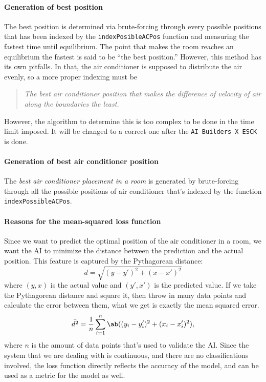 \paragraph{Generation of best position} The best position is determined via brute-forcing through every possible positions that has been indexed by the \texttt{indexPosibleACPos} function and measuring the fastest time until equilibrium. The point that makes the room reaches an equilibrium the fastest is said to be \enquote{the best position.} However, this method has its own pitfalls. In that, the air conditioner is supposed to distribute the air evenly, so a more proper indexing must be
\begin{quote}
    \emph{The best air conditioner position that makes the difference of velocity of air along the boundaries the least.}
\end{quote}
However, the algorithm to determine this is too complex to be done in the time limit imposed. It will be changed to a correct one after the \texttt{AI Builders X ESCK} is done.

\paragraph{Generation of best air conditioner position} The \emph{best air conditioner placement in a room} is generated by brute-forcing through all the possible positions of air conditioner that's indexed by the function \texttt{indexPossibleACPos}.

\paragraph{Reasons for the mean-squared loss function} Since we want to predict the optimal position of the air conditioner in a room, we want the AI to minimize the distance between the prediction and the actual position. This feature is captured by the Pythagorean distance:
\begin{equation}
    d = \sqrt{(y - y')^2 + (x - x')^2}
\end{equation}
where $(y, x)$ is the actual value and $(y', x')$ is the predicted value. If we take the Pythagorean distance and square it, then throw in many data points and calculate the error between them, what we get is exactly the mean squared error.
\begin{equation}
    \bar{d^2} = \frac{1}{n}\sum_{i = 1}^{n}\ab((y_i - y'_i)^2 + (x_i - x_i')^2),
\end{equation}
where $n$ is the amount of data points that's used to validate the AI. Since the system that we are dealing with is continuous, and there are no classifications involved, the loss function directly reflects the accuracy of the model, and can be used as a metric for the model as well.

